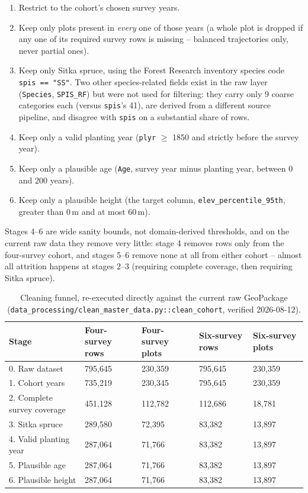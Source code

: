 \begin{enumerate}
\setlength\itemsep{0pt}
\item Restrict to the cohort's chosen survey years.
\item Keep only plots present in \emph{every} one of those years (a whole plot is dropped if any
  one of its required survey rows is missing -- balanced trajectories only, never partial ones).
\item Keep only Sitka spruce, using the Forest Research inventory species code
  \texttt{spis == "SS"}. Two other species-related fields exist in the raw layer
  (\texttt{Species}, \texttt{SPIS\_RF}) but were not used for filtering: they carry only 9 coarse
  categories each (versus \texttt{spis}'s 41), are derived from a different source pipeline, and
  disagree with \texttt{spis} on a substantial share of rows.
\item Keep only a valid planting year (\texttt{plyr} $\geq$ 1850 and strictly before the survey
  year).
\item Keep only a plausible age (\texttt{Age}, survey year minus planting year, between 0 and 200
  years).
\item Keep only a plausible height (the target column, \texttt{elev\_percentile\_95th}, greater
  than 0\,m and at most 60\,m).
\end{enumerate}

Stages 4--6 are wide sanity bounds, not domain-derived thresholds, and on the current raw data
they remove very little: stage 4 removes rows only from the four-survey cohort, and stages 5--6
remove none at all from either cohort -- almost all attrition happens at stages 2--3 (requiring
complete coverage, then requiring Sitka spruce).

\begin{table}[!htbp]
\centering
\scriptsize
\setlength{\tabcolsep}{3pt}
\renewcommand{\arraystretch}{0.95}
\begin{tabular}{p{4.6cm}p{2.6cm}p{2.6cm}p{2.6cm}p{2.6cm}}
\hline
Stage & Four-survey rows & Four-survey plots & Six-survey rows & Six-survey plots \\
\hline
0. Raw dataset & 795,645 & 230,359 & 795,645 & 230,359 \\
1. Cohort years & 735,219 & 230,345 & 795,645 & 230,359 \\
2. Complete survey coverage & 451,128 & 112,782 & 112,686 & 18,781 \\
3. Sitka spruce & 289,580 & 72,395 & 83,382 & 13,897 \\
4. Valid planting year & 287,064 & 71,766 & 83,382 & 13,897 \\
5. Plausible age & 287,064 & 71,766 & 83,382 & 13,897 \\
6. Plausible height & 287,064 & 71,766 & 83,382 & 13,897 \\
\hline
\end{tabular}
\caption{Cleaning funnel, re-executed directly against the current raw GeoPackage
(\texttt{data\_processing/clean\_master\_data.py::clean\_cohort}, verified 2026-08-12).}
\label{tab:data-funnel}
\end{table}

